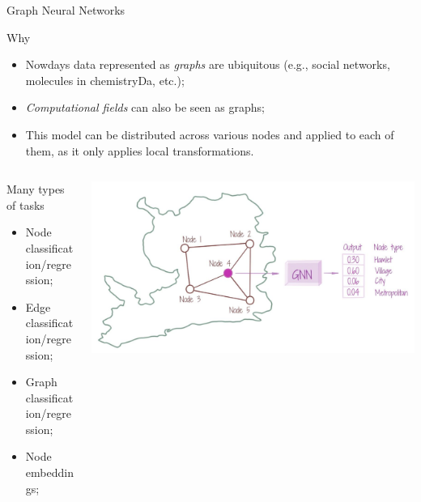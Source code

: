 \documentclass[presentation]{beamer}\mode<presentation>{\usetheme{AMSBolognaFC}}
\begin{document}
\begin{frame}[allowframebreaks]{Graph Neural Networks}

\begin{block}{Why}
	\begin{itemize}
		\item Nowdays data represented as \emph{graphs} are ubiquitous 
			(e.g., social networks, molecules in chemistryDa, etc.);
		\item \emph{Computational fields} can also be seen as graphs;
		\item This model can be distributed across various nodes and applied to each of them, 
			as it only applies local transformations.
	\end{itemize}
\end{block}

\begin{columns}
	\begin{column}{0.5\textwidth}
		\begin{alertblock}{Many types of tasks}
			\begin{itemize}
				\item Node classification/regression;
				\item Edge classification/regression;
				\item Graph classification/regression;
				\item Node embeddings;
			\end{itemize}
		\end{alertblock}
	\end{column}
	\begin{column}{0.5\textwidth}
		\includegraphics[width=\textwidth]{img/gnn.png}
	\end{column}
\end{columns}



\end{frame}
\end{document}

